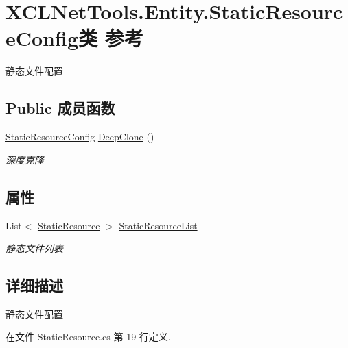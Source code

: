 \hypertarget{class_x_c_l_net_tools_1_1_entity_1_1_static_resource_config}{\section{X\-C\-L\-Net\-Tools.\-Entity.\-Static\-Resource\-Config类 参考}
\label{class_x_c_l_net_tools_1_1_entity_1_1_static_resource_config}
}


静态文件配置  


\subsection*{Public 成员函数}
\begin{DoxyCompactItemize}
\item 
\hyperlink{class_x_c_l_net_tools_1_1_entity_1_1_static_resource_config}{Static\-Resource\-Config} \hyperlink{class_x_c_l_net_tools_1_1_entity_1_1_static_resource_config_a488ef1a24b5a4be8cdfc93610cc8bb31}{Deep\-Clone} ()
\begin{DoxyCompactList}\small\item\em 深度克隆 \end{DoxyCompactList}\end{DoxyCompactItemize}
\subsection*{属性}
\begin{DoxyCompactItemize}
\item 
List$<$ \hyperlink{class_x_c_l_net_tools_1_1_entity_1_1_static_resource}{Static\-Resource} $>$ \hyperlink{class_x_c_l_net_tools_1_1_entity_1_1_static_resource_config_a4525e28db253a1da329b5ebd1982f04d}{Static\-Resource\-List}
\begin{DoxyCompactList}\small\item\em 静态文件列表 \end{DoxyCompactList}\end{DoxyCompactItemize}


\subsection{详细描述}
静态文件配置 



在文件 Static\-Resource.\-cs 第 19 行定义.



